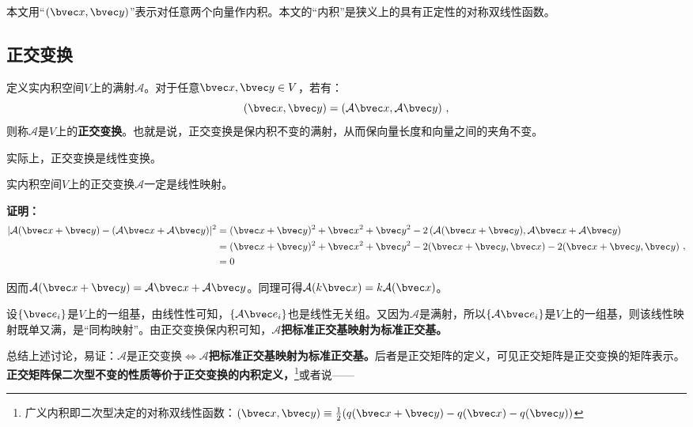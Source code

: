 
本文用“$(\bvec x,\bvec y)$”表示对任意两个向量作内积。本文的“内积”是狭义上的具有正定性的对称双线性函数。
\subsection{正交变换}
\begin{definition}{}\label{def_ortho_1}
定义实内积空间$V$上的满射$\mathcal A$。对于任意$\bvec x,\bvec y\in V$，若有：
\begin{equation}
(\bvec x,\bvec y)=(\mathcal A \bvec x,\mathcal A \bvec y)~,
\end{equation}
则称$\mathcal A$是$V$上的\textbf{正交变换}。也就是说，正交变换是保内积不变的满射，从而保向量长度和向量之间的夹角不变。
\end{definition}
实际上，正交变换是线性变换。
\begin{theorem}{}\label{the_ortho_1}
实内积空间$V$上的正交变换$\mathcal A$一定是线性映射。
\end{theorem}
\textbf{证明：}
\begin{equation}
\begin{aligned}
|\mathcal A(\bvec x+\bvec y)-(\mathcal A\bvec x+\mathcal A\bvec y)|^2&=(\bvec x+\bvec y)^2+\bvec x^2+\bvec y^2-2\left(\mathcal A(\bvec x+\bvec y),\mathcal A\bvec x+\mathcal A\bvec y\right)\\
&=(\bvec x+\bvec y)^2+\bvec x^2+\bvec y^2-2(\bvec x+\bvec y,\bvec x)-2(\bvec x+\bvec y,\bvec y)\\
&=0
\end{aligned}
~,\end{equation}

因而$\mathcal A(\bvec x+\bvec y)=\mathcal A\bvec x+\mathcal A\bvec y$。同理可得$\mathcal A(k\bvec x)=k\mathcal A(\bvec x)$。

设$\{\bvec e_i\}$是$V$上的一组基，由线性性可知，$\{\mathcal A\bvec e_i\}$也是线性无关组。又因为$\mathcal A$是满射，所以$\{\mathcal A\bvec e_i\}$是$V$上的一组基，则该线性映射既单又满，是“同构映射”。由正交变换保内积可知，$\mathcal A$\textbf{把标准正交基映射为标准正交基。}

总结上述讨论，易证：$\mathcal A$是正交变换$\Longleftrightarrow \mathcal A$\textbf{把标准正交基映射为标准正交基。}后者是正交矩阵的定义，可见正交矩阵是正交变换的矩阵表示。\textbf{正交矩阵保二次型不变的性质等价于正交变换的内积定义，}\footnote{广义内积即二次型决定的对称双线性函数：$(\bvec x,\bvec y)\equiv \frac{1}{2}(q(\bvec x+\bvec y)-q(\bvec x)-q(\bvec y))$}或者说——

